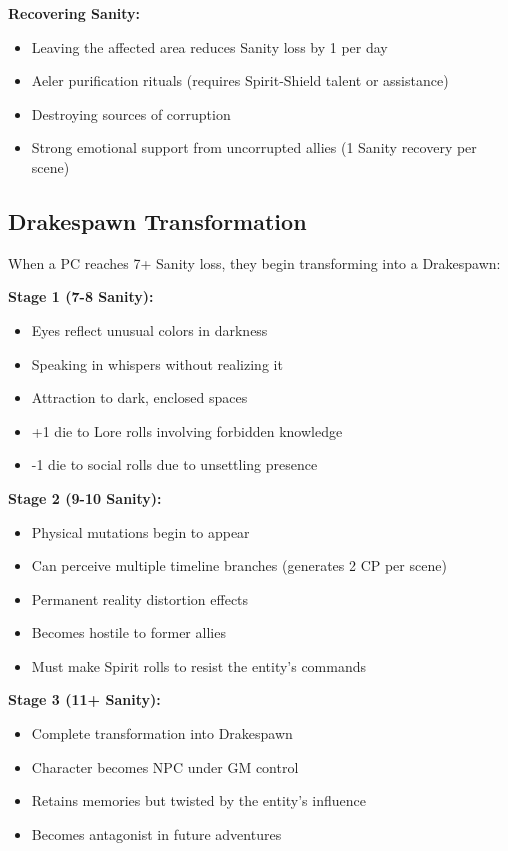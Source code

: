 \documentclass[11pt]{article}
\begin{document}
\textbf{Recovering Sanity:}
\begin{itemize}
\item Leaving the affected area reduces Sanity loss by 1 per day
\item Aeler purification rituals (requires Spirit-Shield talent or assistance)
\item Destroying sources of corruption
\item Strong emotional support from uncorrupted allies (1 Sanity recovery per scene)
\end{itemize}

\subsection{Drakespawn Transformation}

When a PC reaches 7+ Sanity loss, they begin transforming into a Drakespawn:

\textbf{Stage 1 (7-8 Sanity):}
\begin{itemize}
\item Eyes reflect unusual colors in darkness
\item Speaking in whispers without realizing it
\item Attraction to dark, enclosed spaces
\item +1 die to Lore rolls involving forbidden knowledge
\item -1 die to social rolls due to unsettling presence
\end{itemize}

\textbf{Stage 2 (9-10 Sanity):}
\begin{itemize}
\item Physical mutations begin to appear
\item Can perceive multiple timeline branches (generates 2 CP per scene)
\item Permanent reality distortion effects
\item Becomes hostile to former allies
\item Must make Spirit rolls to resist the entity's commands
\end{itemize}

\textbf{Stage 3 (11+ Sanity):}
\begin{itemize}
\item Complete transformation into Drakespawn
\item Character becomes NPC under GM control
\item Retains memories but twisted by the entity's influence
\item Becomes antagonist in future adventures
\end{itemize}
\end{document}
